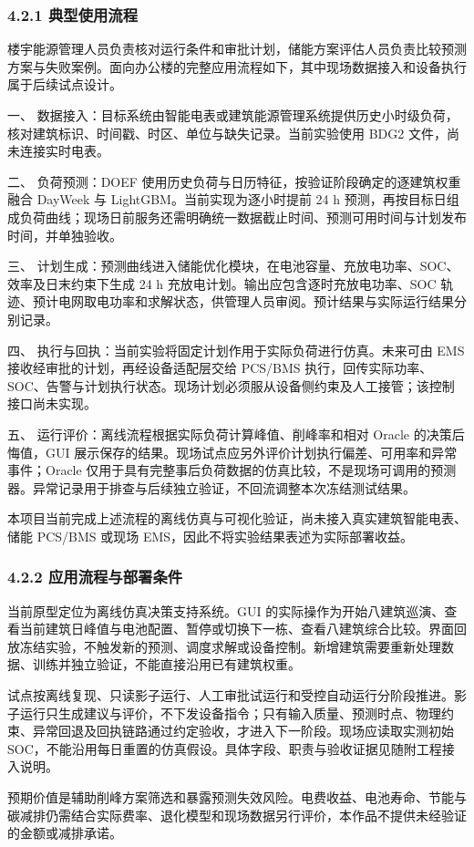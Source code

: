 \documentclass[12pt,a4paper]{article}
\begin{document}
\subsubsection{4.2.1 典型使用流程}
楼宇能源管理人员负责核对运行条件和审批计划，储能方案评估人员负责比较预测方案与失败案例。面向办公楼的完整应用流程如下，其中现场数据接入和设备执行属于后续试点设计。\par
一、 数据接入：目标系统由智能电表或建筑能源管理系统提供历史小时级负荷，核对建筑标识、时间戳、时区、单位与缺失记录。当前实验使用 BDG2 文件，尚未连接实时电表。\par
二、 负荷预测：DOEF 使用历史负荷与日历特征，按验证阶段确定的逐建筑权重融合 DayWeek 与 LightGBM。当前实现为逐小时提前 24 h 预测，再按目标日组成负荷曲线；现场日前服务还需明确统一数据截止时间、预测可用时间与计划发布时间，并单独验收。\par
三、 计划生成：预测曲线进入储能优化模块，在电池容量、充放电功率、SOC、效率及日末约束下生成 24 h 充放电计划。输出应包含逐时充放电功率、SOC 轨迹、预计电网取电功率和求解状态，供管理人员审阅。预计结果与实际运行结果分别记录。\par
四、 执行与回执：当前实验将固定计划作用于实际负荷进行仿真。未来可由 EMS 接收经审批的计划，再经设备适配层交给 PCS/BMS 执行，回传实际功率、SOC、告警与计划执行状态。现场计划必须服从设备侧约束及人工接管；该控制接口尚未实现。\par
五、 运行评价：离线流程根据实际负荷计算峰值、削峰率和相对 Oracle 的决策后悔值，GUI 展示保存的结果。现场试点应另外评价计划执行偏差、可用率和异常事件；Oracle 仅用于具有完整事后负荷数据的仿真比较，不是现场可调用的预测器。异常记录用于排查与后续独立验证，不回流调整本次冻结测试结果。\par
本项目当前完成上述流程的离线仿真与可视化验证，尚未接入真实建筑智能电表、储能 PCS/BMS 或现场 EMS，因此不将实验结果表述为实际部署收益。\par
\subsubsection{4.2.2 应用流程与部署条件}
当前原型定位为离线仿真决策支持系统。GUI 的实际操作为开始八建筑巡演、查看当前建筑日峰值与电池配置、暂停或切换下一栋、查看八建筑综合比较。界面回放冻结实验，不触发新的预测、调度求解或设备控制。新增建筑需要重新处理数据、训练并独立验证，不能直接沿用已有建筑权重。\par
试点按离线复现、只读影子运行、人工审批试运行和受控自动运行分阶段推进。影子运行只生成建议与评价，不下发设备指令；只有输入质量、预测时点、物理约束、异常回退及回执链路通过约定验收，才进入下一阶段。现场应读取实测初始 SOC，不能沿用每日重置的仿真假设。具体字段、职责与验收证据见随附工程接入说明。\par
预期价值是辅助削峰方案筛选和暴露预测失效风险。电费收益、电池寿命、节能与碳减排仍需结合实际费率、退化模型和现场数据另行评价，本作品不提供未经验证的金额或减排承诺。\par
\end{document}
